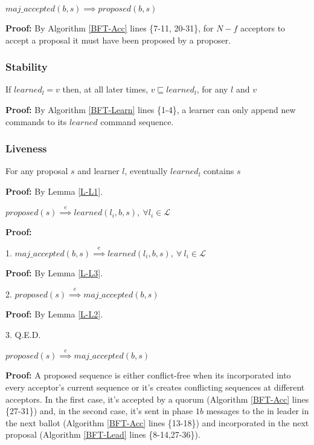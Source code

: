 \begin{lemma}
$maj\_accepted(b,s) \implies proposed(b,s)$ \label{N-L1} \par
\end{lemma}
\textbf{Proof:} By Algorithm \ref{BFT-Acc} lines \{7-11, 20-31\}, for $N-f$ acceptors to accept a proposal it must have been proposed by a proposer.

\subsubsection{Stability}
\begin{theorem}
If $learned_l = v$ then, at all later times, $v \sqsubseteq learned_l$, for any $l$ and $v$ \par \label{S-T1}
\end{theorem} 
\textbf{Proof:} By Algorithm \ref{BFT-Learn} lines \{1-4\}, a learner can only append new commands to its $learned$ command sequence.

\subsubsection{Liveness}
\begin{theorem}
For any proposal $s$ and learner $l$, eventually $learned_l$ contains $s$ \label{L-T1} \par
\end{theorem} 
\textbf{Proof:} By Lemma \ref{L-L1}.
\begin{lemma}
$proposed(s) \overset{e}{\implies} learned(l_i,b,s),\ \forall l_i \in \mathcal{L}$ \label{L-L1} \par
\end{lemma}
\textbf{Proof:} \par
1. $maj\_accepted(b,s) \overset{e}{\implies} learned(l_i,b,s),\ \forall\ l_i \in \mathcal{L}$ \par
\indent\indent\textbf{Proof:} By Lemma \ref{L-L3}.\par
2. $proposed(s) \overset{e}{\implies} maj\_accepted(b,s)$ \par
\indent\indent\textbf{Proof:} By Lemma \ref{L-L2}. \par
3. Q.E.D.

\begin{lemma}
$proposed(s) \overset{e}{\implies} maj\_accepted(b,s)$ \label{L-L2}
\end{lemma}

\textbf{Proof:} A proposed sequence is either conflict-free when its incorporated into every acceptor's current sequence or it's creates conflicting sequences at different acceptors. In the first case, it's accepted by a quorum (Algorithm \ref{BFT-Acc} lines \{27-31\}) and, in the second case, it's sent in phase $1b$ messages to the in leader in the next ballot (Algorithm \ref{BFT-Acc} lines \{13-18\}) and incorporated in the next proposal (Algorithm \ref{BFT-Lead} lines \{8-14,27-36\}). 

